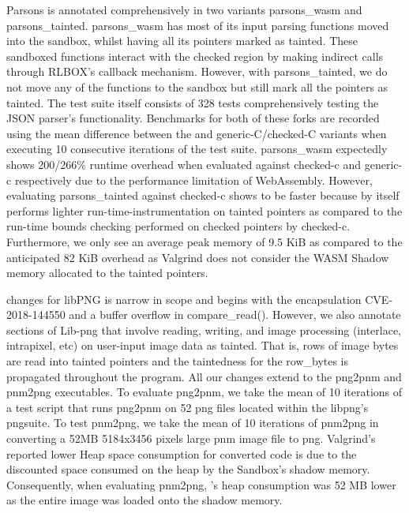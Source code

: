 Parsons is annotated comprehensively in two variants parsons\_wasm and parsons\_tainted. parsons\_wasm has most of its input parsing functions moved into the sandbox, whilst having all its pointers marked as tainted. These sandboxed functions interact with the checked region by making indirect calls through RLBOX's callback mechanism. However, with parsons\_tainted, we do not move any of the functions to the sandbox but still mark all the pointers as tainted. The test suite itself consists of 328 tests comprehensively testing the JSON parser's functionality. Benchmarks for both of these forks are recorded using the mean difference between the \systemname and generic-C/checked-C variants when executing 10 consecutive iterations of the test suite. parsons\_wasm expectedly shows 200/266\% runtime overhead when evaluated against checked-c and generic-c respectively due to the performance limitation of WebAssembly. However, evaluating parsons\_tainted against checked-c shows \systemname to be faster because \systemname by itself performs lighter run-time-instrumentation on tainted pointers as compared to the run-time bounds checking performed on checked pointers by checked-c. Furthermore, we only see an average peak memory of 9.5 KiB as compared to the anticipated 82 KiB overhead as Valgrind does not consider the WASM Shadow memory allocated to the tainted pointers.

\systemname changes for libPNG is narrow in scope and begins with the encapsulation CVE-2018-144550 and a buffer overflow in compare\_read(). However, we also annotate sections of Lib-png that involve reading, writing, and image processing (interlace, intrapixel, etc) on user-input image data as tainted. That is, rows of image bytes are read into tainted pointers and the taintedness for the row\_bytes is propagated throughout the program. All our changes extend to the png2pnm and pnm2png executables. To evaluate png2pnm, we take the mean of 10 iterations of a test script that runs png2pnm on 52 png files located within the libpng's pngsuite. To test pnm2png, we take the mean of 10 iterations of pnm2png in converting a 52MB 5184x3456 pixels large pnm image file to png. Valgrind's reported lower Heap space consumption for \systemname converted code is due to the discounted space consumed on the heap by the Sandbox's shadow memory. Consequently, when evaluating pnm2png, \systemname's heap consumption was 52 MB lower as the entire image was loaded onto the shadow memory.  

